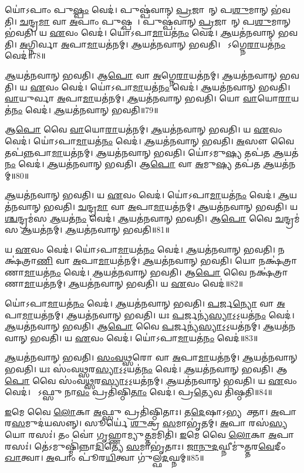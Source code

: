 𑌯𑍋॑𑌽𑌪𑌾𑌂 𑌪𑍁\ul{𑌷𑍍𑌪𑌂} 𑌵𑍇𑌦॑। 𑌪𑍁𑌷𑍍𑌪॑𑌵𑌾𑌨𑍍‌ \ul{𑌪𑍍𑌰}𑌜𑌾𑌵𑌾᳚𑌨𑍍 𑌪\ul{𑌶𑍁}𑌮𑌾𑌨𑍍 𑌭॑𑌵𑌤𑌿। 
\ul{𑌚}𑌨𑍍𑌦𑍍𑌰\ul{𑌮𑌾} 𑌵𑌾 \ul{𑌅}𑌪𑌾𑌂 𑌪𑍁𑌷𑍍𑌪𑌮𑍍᳚। 𑌪𑍁𑌷𑍍𑌪॑𑌵𑌾𑌨𑍍 \ul{𑌪𑍍𑌰}𑌜𑌾𑌵𑌾᳚𑌨𑍍 𑌪\ul{𑌶𑍁}𑌮𑌾𑌨𑍍‌ 𑌭॑𑌵𑌤𑌿। 
𑌯 \ul{𑌏}𑌵𑌂 𑌵𑍇𑌦॑। 𑌯𑍋॑𑌽𑌪𑌾\ul{𑌮𑌾}𑌯𑌤॑\ul{𑌨𑌂} 𑌵𑍇𑌦॑। 
\ul{𑌆}𑌯𑌤॑𑌨𑌵𑌾𑌨𑍍‌ 𑌭𑌵𑌤𑌿। \ul{𑌅}𑌗𑍍𑌨𑌿𑌰𑍍𑌵𑌾 \ul{𑌅}𑌪𑌾\ul{𑌮𑌾}𑌯𑌤॑𑌨𑌮𑍍। 
\ul{𑌆}𑌯𑌤॑𑌨𑌵𑌾𑌨𑍍‌ 𑌭𑌵𑌤𑌿। 𑌯𑍋᳚𑌽𑌗𑍍𑌨𑍇\ul{𑌰𑌾}𑌯𑌤॑\ul{𑌨𑌂} 𑌵𑍇𑌦॑॥78॥


\ul{𑌆}𑌯𑌤॑𑌨𑌵𑌾𑌨𑍍‌ 𑌭𑌵𑌤𑌿। 𑌆\ul{𑌪𑍋} 𑌵𑌾 \ul{𑌅}𑌗𑍍𑌨𑍇\ul{𑌰𑌾}𑌯𑌤॑𑌨𑌮𑍍‌। 
\ul{𑌆}𑌯𑌤॑𑌨𑌵𑌾𑌨𑍍‌ 𑌭𑌵𑌤𑌿। 𑌯 \ul{𑌏}𑌵𑌂 𑌵𑍇𑌦॑। 
𑌯𑍋॑𑌽𑌪𑌾\ul{𑌮𑌾}𑌯𑌤॑\ul{𑌨𑌂} 𑌵𑍇𑌦॑। \ul{𑌆}𑌯𑌤॑𑌨𑌵𑌾𑌨𑍍‌ 𑌭𑌵𑌤𑌿। 
\ul{𑌵𑌾}𑌯𑍁𑌰𑍍𑌵𑌾 \ul{𑌅}𑌪𑌾\ul{𑌮𑌾}𑌯𑌤॑𑌨𑌮𑍍। \ul{𑌆}𑌯𑌤॑𑌨𑌵𑌾𑌨𑍍‌ 𑌭𑌵𑌤𑌿। 
𑌯𑍋 \ul{𑌵𑌾}𑌯𑍋\ul{𑌰𑌾}𑌯𑌤॑\ul{𑌨𑌂} 𑌵𑍇𑌦॑। \ul{𑌆}𑌯𑌤॑𑌨𑌵𑌾𑌨𑍍‌ 𑌭𑌵𑌤𑌿॥79॥


𑌆\ul{𑌪𑍋} 𑌵𑍈 \ul{𑌵𑌾}𑌯𑍋\ul{𑌰𑌾}𑌯𑌤॑𑌨𑌮𑍍। \ul{𑌆}𑌯𑌤॑𑌨𑌵𑌾𑌨𑍍‌ 𑌭𑌵𑌤𑌿। 
𑌯 \ul{𑌏}𑌵𑌂 𑌵𑍇𑌦॑। 𑌯𑍋॑𑌽𑌪𑌾\ul{𑌮𑌾}𑌯𑌤॑\ul{𑌨𑌂} 𑌵𑍇𑌦॑। 
\ul{𑌆}𑌯𑌤॑𑌨𑌵𑌾𑌨𑍍‌ 𑌭𑌵𑌤𑌿। \ul{𑌅}𑌸𑍗 𑌵𑍈 𑌤𑌪॑\ul{𑌨𑍍𑌨}𑌪𑌾\ul{𑌮𑌾}𑌯𑌤॑𑌨𑌮𑍍। 
\ul{𑌆}𑌯𑌤॑𑌨𑌵𑌾𑌨𑍍‌ 𑌭𑌵𑌤𑌿। 𑌯𑍋॑𑌽𑌮𑍁\ul{𑌷𑍍𑌯} 𑌤𑌪॑𑌤 \ul{𑌆}𑌯𑌤॑\ul{𑌨𑌂} 𑌵𑍇𑌦॑। 
\ul{𑌆}𑌯𑌤॑𑌨𑌵𑌾𑌨𑍍‌ 𑌭𑌵𑌤𑌿। 𑌆\ul{𑌪𑍋} 𑌵𑌾 \ul{𑌅}𑌮𑍁\ul{𑌷𑍍𑌯} 𑌤𑌪॑𑌤 \ul{𑌆}𑌯𑌤॑𑌨𑌮𑍍॥80॥


\ul{𑌆}𑌯𑌤॑𑌨𑌵𑌾𑌨𑍍‌ 𑌭𑌵𑌤𑌿। 𑌯 \ul{𑌏}𑌵𑌂 𑌵𑍇𑌦॑। 
𑌯𑍋॑𑌽𑌪𑌾\ul{𑌮𑌾}𑌯𑌤॑\ul{𑌨𑌂} 𑌵𑍇𑌦॑। \ul{𑌆}𑌯𑌤॑𑌨𑌵𑌾𑌨𑍍‌ 𑌭𑌵𑌤𑌿। 
\ul{𑌚}𑌨𑍍𑌦𑍍𑌰\ul{𑌮𑌾} 𑌵𑌾 \ul{𑌅}𑌪𑌾\ul{𑌮𑌾}𑌯𑌤॑𑌨𑌮𑍍‌। \ul{𑌆}𑌯𑌤॑𑌨𑌵𑌾𑌨𑍍‌ 𑌭𑌵𑌤𑌿। 
𑌯\ul{𑌶𑍍𑌚}𑌨𑍍𑌦𑍍𑌰𑌮॑𑌸 \ul{𑌆}𑌯𑌤॑\ul{𑌨𑌂} 𑌵𑍇𑌦॑। \ul{𑌆}𑌯𑌤॑𑌨𑌵𑌾𑌨𑍍‌ 𑌭𑌵𑌤𑌿। 
𑌆\ul{𑌪𑍋} 𑌵𑍈 \ul{𑌚}𑌨𑍍𑌦𑍍𑌰𑌮॑𑌸 \ul{𑌆}𑌯𑌤॑𑌨𑌮𑍍। \ul{𑌆}𑌯𑌤॑𑌨𑌵𑌾𑌨𑍍‌ 𑌭𑌵𑌤𑌿॥81॥


𑌯 \ul{𑌏}𑌵𑌂 𑌵𑍇𑌦॑। 𑌯𑍋॑𑌽𑌪𑌾\ul{𑌮𑌾}𑌯𑌤॑\ul{𑌨𑌂} 𑌵𑍇𑌦॑। 
\ul{𑌆}𑌯𑌤॑𑌨𑌵𑌾𑌨𑍍‌ 𑌭𑌵𑌤𑌿। 𑌨𑌕𑍍𑌷॑𑌤𑍍𑌰𑌾\ul{𑌣𑌿} 𑌵𑌾 \ul{𑌅}𑌪𑌾\ul{𑌮𑌾}𑌯𑌤॑𑌨𑌮𑍍। 
\ul{𑌆}𑌯𑌤॑𑌨𑌵𑌾𑌨𑍍‌ 𑌭𑌵𑌤𑌿। 𑌯𑍋 𑌨𑌕𑍍𑌷॑𑌤𑍍𑌰𑌾𑌣𑌾\ul{𑌮𑌾}𑌯𑌤॑\ul{𑌨𑌂} 𑌵𑍇𑌦॑। 
\ul{𑌆}𑌯𑌤॑𑌨𑌵𑌾𑌨𑍍‌ 𑌭𑌵𑌤𑌿। 𑌆\ul{𑌪𑍋} 𑌵𑍈 𑌨𑌕𑍍𑌷॑𑌤𑍍𑌰𑌾𑌣𑌾\ul{𑌮𑌾}𑌯𑌤॑𑌨𑌮𑍍। 
\ul{𑌆}𑌯𑌤॑𑌨𑌵𑌾𑌨𑍍‌ 𑌭𑌵𑌤𑌿। 𑌯 \ul{𑌏}𑌵𑌂 𑌵𑍇𑌦॑॥82॥


𑌯𑍋॑𑌽𑌪𑌾\ul{𑌮𑌾}𑌯𑌤॑\ul{𑌨𑌂} 𑌵𑍇𑌦॑। \ul{𑌆}𑌯𑌤॑𑌨𑌵𑌾𑌨𑍍‌ 𑌭𑌵𑌤𑌿।
\ul{𑌪}𑌰𑍍𑌜\ul{𑌨𑍍𑌯𑍋} 𑌵𑌾 \ul{𑌅}𑌪𑌾\ul{𑌮𑌾}𑌯𑌤॑𑌨𑌮𑍍। \ul{𑌆}𑌯𑌤॑𑌨𑌵𑌾𑌨𑍍‌ 𑌭𑌵𑌤𑌿। 
𑌯𑌃 \ul{𑌪}𑌰𑍍𑌜𑌨𑍍𑌯॑\ul{𑌸𑍍𑌯𑌾}𑌽॒𑌽॒𑌯𑌤॑\ul{𑌨𑌂} 𑌵𑍇𑌦॑। \ul{𑌆}𑌯𑌤॑𑌨𑌵𑌾𑌨𑍍‌ 𑌭𑌵𑌤𑌿। 
𑌆\ul{𑌪𑍋} 𑌵𑍈 \ul{𑌪}𑌰𑍍𑌜𑌨𑍍𑌯॑\ul{𑌸𑍍𑌯𑌾}𑌽॒𑌽॒𑌯𑌤॑𑌨𑌮𑍍। \ul{𑌆}𑌯𑌤॑𑌨𑌵𑌾𑌨𑍍‌ 𑌭𑌵𑌤𑌿। 
𑌯 \ul{𑌏}𑌵𑌂 𑌵𑍇𑌦॑। 𑌯𑍋॑𑌽𑌪𑌾\ul{𑌮𑌾}𑌯𑌤॑\ul{𑌨𑌂} 𑌵𑍇𑌦॑॥83॥


\ul{𑌆}𑌯𑌤॑𑌨𑌵𑌾𑌨𑍍‌ 𑌭𑌵𑌤𑌿। \ul{𑌸𑌂}\ul{𑌵}\ul{𑌥𑍍𑌸}𑌰𑍋 𑌵𑌾 \ul{𑌅}𑌪𑌾\ul{𑌮𑌾}𑌯𑌤॑𑌨𑌮𑍍। 
\ul{𑌆}𑌯𑌤॑𑌨𑌵𑌾𑌨𑍍‌ 𑌭𑌵𑌤𑌿। 𑌯𑌃 𑌸𑌂॑𑌵\ul{𑌥𑍍𑌸}𑌰\ul{𑌸𑍍𑌯𑌾}𑌽॒𑌽॒𑌯𑌤॑\ul{𑌨𑌂} 𑌵𑍇𑌦॑। 
\ul{𑌆}𑌯𑌤॑𑌨𑌵𑌾𑌨𑍍‌ 𑌭𑌵𑌤𑌿। 𑌆\ul{𑌪𑍋} 𑌵𑍈 𑌸𑌂॑𑌵\ul{𑌥𑍍𑌸}𑌰\ul{𑌸𑍍𑌯𑌾}𑌽॒𑌽॒𑌯𑌤॑𑌨𑌮𑍍‌। 
\ul{𑌆}𑌯𑌤॑𑌨𑌵𑌾𑌨𑍍‌ 𑌭𑌵𑌤𑌿। 𑌯 \ul{𑌏}𑌵𑌂 𑌵𑍇𑌦॑। 
𑌯𑍋᳚𑌽𑌫𑍍𑌸𑍁 𑌨𑌾\ul{𑌵𑌂} 𑌪𑍍𑌰𑌤𑌿॑𑌷𑍍𑌠𑌿\ul{𑌤𑌾𑌂} 𑌵𑍇𑌦॑। 𑌪𑍍𑌰\ul{𑌤𑍍𑌯𑍇}𑌵 𑌤𑌿॑𑌷𑍍𑌠𑌤𑌿॥84॥


\ul{𑌇}𑌮𑍇 𑌵𑍈 \ul{𑌲𑍋}𑌕𑌾 \ul{𑌅}𑌫𑍍𑌸𑍁 𑌪𑍍𑌰𑌤𑌿॑𑌷𑍍𑌠𑌿𑌤𑌾𑌃। 𑌤\ul{𑌦𑍇}𑌷𑌾𑌽𑌭𑍍𑌯𑌨𑍂᳚𑌕𑍍𑌤𑌾। 
\ul{𑌅}𑌪𑌾 𑌰\ul{𑌸}𑌮𑍁𑌦॑𑌯𑌸𑌨𑍍𑌨𑍍‌। 𑌸𑍂𑌰𑍍𑌯𑍇॑ \ul{𑌶𑍁}𑌕𑍍𑌰 \ul{𑌸}𑌮𑌾𑌭𑍃॑𑌤𑌮𑍍‌। 
\ul{𑌅}𑌪𑌾 𑌰𑌸॑\ul{𑌸𑍍𑌯} 𑌯𑍋 𑌰𑌸𑌃॑। 𑌤𑌂 𑌵𑍋॑ 𑌗𑍃𑌹𑍍𑌣𑌾𑌮𑍍𑌯𑍁\ul{𑌤𑍍𑌤}𑌮𑌮𑌿𑌤𑌿॑। 
\ul{𑌇}𑌮𑍇 𑌵𑍈 \ul{𑌲𑍋}𑌕𑌾 \ul{𑌅}𑌪𑌾 𑌰𑌸𑌃॑। 𑌤𑍇॑𑌽𑌮𑍁𑌷𑍍𑌮𑌿॑𑌨𑍍𑌨𑌾\ul{𑌦𑌿}𑌤𑍍𑌯𑍇 \ul{𑌸}𑌮𑌾𑌭𑍃॑𑌤𑌾𑌃। 
\ul{𑌜𑌾}\ul{𑌨𑍁}\ul{𑌦}𑌘𑍍𑌨𑍀𑌮𑍁॑𑌤𑍍𑌤𑌰\-\ul{𑌵𑍇}𑌦𑍀𑌂 \ul{𑌖𑌾}𑌤𑍍𑌵𑌾। \ul{𑌅}𑌪𑌾𑌂 𑌪𑍂॑𑌰\ul{𑌯𑌿}𑌤𑍍𑌵𑌾 𑌗𑍁॑𑌲𑍍𑌫\ul{𑌦}𑌘𑍍𑌨𑌮𑍍‌॥85॥



